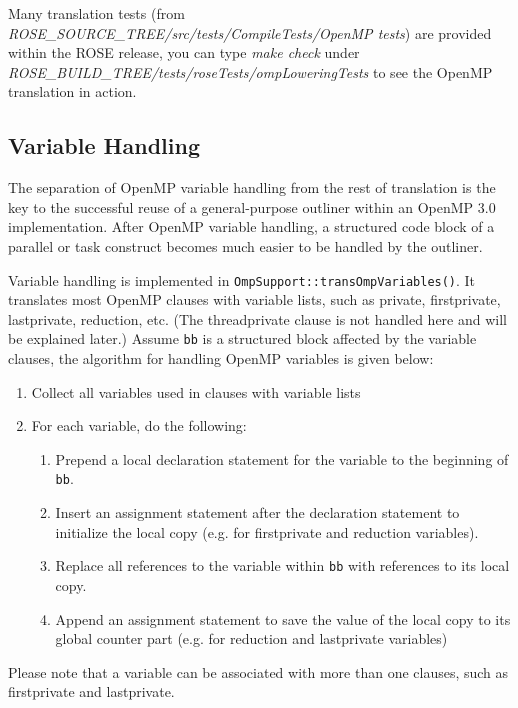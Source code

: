 Many translation tests (from
\textit{ROSE\_SOURCE\_TREE/src/tests/CompileTests/OpenMP tests}) are
provided within the ROSE release, you can type
\textit{make check} under
\textit{ROSE\_BUILD\_TREE/tests/roseTests/ompLoweringTests} to see the
OpenMP translation in action.

\subsection{Variable Handling}
The separation of OpenMP variable handling from the rest of translation is
the key to the successful reuse of a general-purpose outliner within an OpenMP 3.0 implementation. 
After OpenMP variable handling, a structured code block of a parallel or task construct becomes much easier to be handled by the outliner.

Variable handling is implemented in \lstinline{OmpSupport::transOmpVariables()}. 
It translates most OpenMP clauses with variable lists, such as private, firstprivate, lastprivate, reduction, etc.
(The threadprivate clause is not handled here and will be explained later.)
Assume \lstinline{bb} is a structured block affected by the variable clauses, the algorithm for handling OpenMP variables is given below:
\begin{enumerate}
\item Collect all variables used in clauses with variable lists
\item For each variable, do the following:
\begin{enumerate}
\item Prepend a local declaration statement for the variable to the beginning of \lstinline{bb}.
\item Insert an assignment statement after the declaration statement to initialize the local copy (e.g. for firstprivate and reduction variables).
\item Replace all references to the variable within \lstinline{bb} with references to its local copy.
\item Append an assignment statement to save the value of the local copy to its global counter part (e.g. for reduction and lastprivate variables)
\end{enumerate}
\end{enumerate}
Please note that a variable can be associated with more than one clauses, such as firstprivate and lastprivate. 



